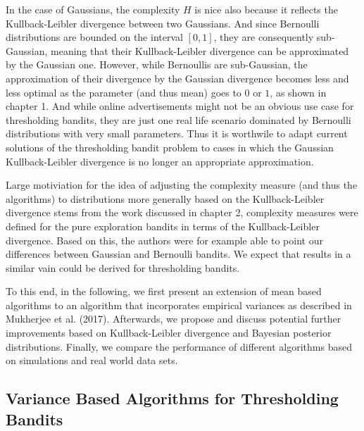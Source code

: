 \documentclass[12pt,]{article}
\begin{document}
In the case of Gaussians, the complexity \(H\) is nice also because it
reflects the Kullback-Leibler divergence between two Gaussians. And
since Bernoulli distributions are bounded on the interval \([0,1]\),
they are consequently sub-Gaussian, meaning that their Kullback-Leibler
divergence can be approximated by the Gaussian one. However, while
Bernoullis are sub-Gaussian, the approximation of their divergence by
the Gaussian divergence becomes less and less optimal as the parameter
(and thus mean) goes to \(0\) or \(1\), as shown in chapter 1. And while
online advertisements might not be an obvious use case for thresholding
bandits, they are just one real life scenario dominated by Bernoulli
distributions with very small parameters. Thus it is worthwile to adapt
current solutions of the thresholding bandit problem to cases in which
the Gaussian Kullback-Leibler divergence is no longer an appropriate
approximation.

Large motiviation for the idea of adjusting the complexity measure (and
thus the algorithms) to distributions more generally based on the
Kullback-Leibler divergence stems from the work discussed in chapter 2,
complexity measures were defined for the pure exploration bandits in
terms of the Kullback-Leibler divergence. Based on this, the authors
were for example able to point our differences between Gaussian and
Bernoulli bandits. We expect that results in a similar vain could be
derived for thresholding bandits.

To this end, in the following, we first present an extension of mean
based algorithms to an algorithm that incorporates empirical variances
as described in Mukherjee et al. (2017). Afterwards, we propose and
discuss potential further improvements based on Kullback-Leibler
divergence and Bayesian posterior distributions. Finally, we compare the
performance of different algorithms based on simulations and real world
data sets.

\subsection{Variance Based Algorithms for Thresholding
Bandits}\label{variance-based-algorithms-for-thresholding-bandits}
\end{document}
